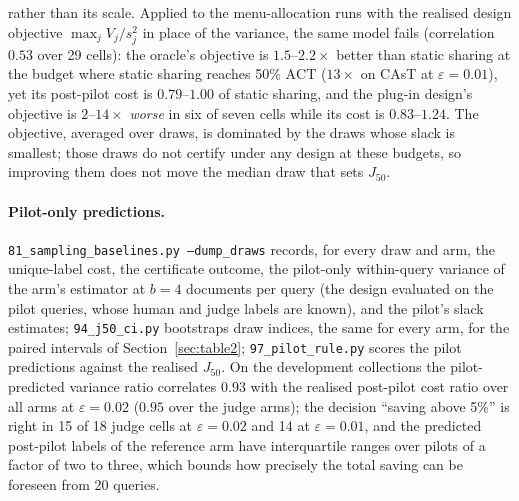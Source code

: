 \documentclass{article}
\newcommand{\eps}{\varepsilon}
\newcommand{\ACT}{\mathrm{ACT}}
\newcommand{\Jfifty}{J_{50}}
\begin{document}
rather than its scale. Applied to the menu-allocation runs with the realised design objective $\max_j V_j/s_j^2$ in place of the variance, the same model fails (correlation $0.53$ over 29 cells): the oracle's objective is $1.5$--$2.2\times$ better than static sharing at the budget where static sharing reaches 50\% $\ACT$ ($13\times$ on CAsT at $\eps=0.01$), yet its post-pilot cost is $0.79$--$1.00$ of static sharing, and the plug-in design's objective is $2$--$14\times$ \emph{worse} in six of seven cells while its cost is $0.83$--$1.24$. The objective, averaged over draws, is dominated by the draws whose slack is smallest; those draws do not certify under any design at these budgets, so improving them does not move the median draw that sets $\Jfifty$.

\paragraph{Pilot-only predictions.} \texttt{81\_sampling\_baselines.py --dump\_draws} records, for every draw and arm, the unique-label cost, the certificate outcome, the pilot-only within-query variance of the arm's estimator at $b=4$ documents per query (the design evaluated on the pilot queries, whose human and judge labels are known), and the pilot's slack estimates; \texttt{94\_j50\_ci.py} bootstraps draw indices, the same for every arm, for the paired intervals of Section~\ref{sec:table2}; \texttt{97\_pilot\_rule.py} scores the pilot predictions against the realised $\Jfifty$. On the development collections the pilot-predicted variance ratio correlates $0.93$ with the realised post-pilot cost ratio over all arms at $\eps=0.02$ ($0.95$ over the judge arms); the decision ``saving above 5\%'' is right in 15 of 18 judge cells at $\eps=0.02$ and 14 at $\eps=0.01$, and the predicted post-pilot labels of the reference arm have interquartile ranges over pilots of a factor of two to three, which bounds how precisely the total saving can be foreseen from 20 queries.
\end{document}
